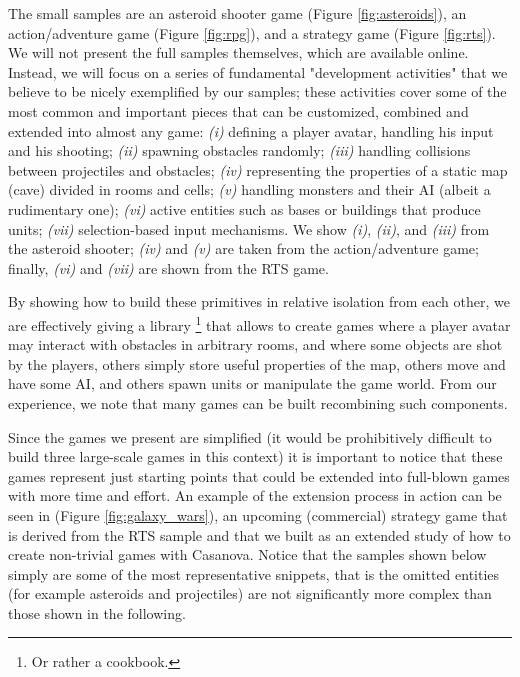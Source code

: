 The small samples are an asteroid shooter game (Figure \ref{fig:asteroids}), an action/adventure game (Figure \ref{fig:rpg}), and a strategy game (Figure \ref{fig:rts}). We will not present the full samples themselves, which are available online. Instead, we will focus on a series of fundamental "development activities" that we believe to be nicely exemplified by our samples; these activities cover some of the most common and important pieces that can be customized, combined and extended into almost any game: \textit{(i)} defining a player avatar, handling his input and his shooting; \textit{(ii)} spawning obstacles randomly; \textit{(iii)} handling collisions between projectiles and obstacles; \textit{(iv)} representing the properties of a static map (cave) divided in rooms and cells; \textit{(v)} handling monsters and their AI (albeit a rudimentary one); \textit{(vi)} active entities such as bases or buildings that produce units; \textit{(vii)} selection-based input mechanisms. We show \textit{(i)}, \textit{(ii)}, and \textit{(iii)} from the asteroid shooter; \textit{(iv)} and \textit{(v)} are taken from the action/adventure game; finally, \textit{(vi)} and \textit{(vii)} are shown from the RTS game. 

By showing how to build these primitives in relative isolation from each other, we are effectively giving a library \footnote{Or rather a cookbook.} that allows to create games where a player avatar may interact with obstacles in arbitrary rooms, and where some objects are shot by the players, others simply store useful properties of the map, others move and have some AI, and others spawn units or manipulate the game world. From our experience, we note that many games can be built recombining such components. 

Since the games we present are simplified (it would be prohibitively difficult to build three large-scale games in this context) it is important to notice that these games represent just starting points that could be extended into full-blown games with more time and effort. An example of the extension process in action can be seen in \cite{GALAXY_WARS} (Figure \ref{fig:galaxy_wars}), an upcoming (commercial) strategy game that is derived from the RTS sample and that we built as an extended study of how to create non-trivial games with Casanova. Notice that the samples shown below simply are some of the most representative snippets, that is the omitted entities (for example asteroids and projectiles) are not significantly more complex than those shown in the following. 

